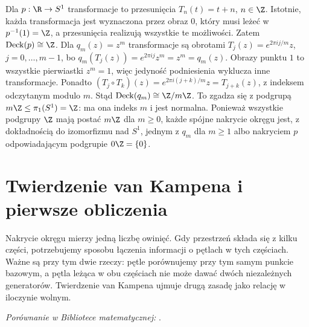 \begin{przyklad}
Dla $p:\R\to S^1$ transformacje to przesunięcia
$T_n(t)=t+n$, $n\in\Z$. Istotnie, każda transformacja
jest wyznaczona przez obraz $0$, który musi leżeć
w $p^{-1}(1)=\Z$, a przesunięcia realizują wszystkie
te możliwości. Zatem $\operatorname{Deck}(p)\cong\Z$.
Dla $q_m(z)=z^m$ transformacje są obrotami
$T_j(z)=e^{2\pi i j/m}z$, $j=0,\ldots,m-1$,
bo $q_m(T_j(z))=e^{2\pi ij}z^m=z^m=q_m(z)$.
Obrazy punktu $1$ to wszystkie pierwiastki $z^m=1$,
więc jedyność podniesienia wyklucza inne transformacje.
Ponadto $(T_j\circ T_k)(z)=e^{2\pi i(j+k)/m}z=T_{j+k}(z)$,
z indeksem odczytanym modulo $m$.
Stąd $\operatorname{Deck}(q_m)\cong\Z/m\Z$.
To zgadza się z podgrupą $m\Z\leq\pi_1(S^1)=\Z$:
ma ona indeks $m$ i jest normalna. Ponieważ wszystkie
podgrupy $\Z$ mają postać $m\Z$ dla $m\geq0$,
każde spójne nakrycie okręgu jest, z dokładnością
do izomorfizmu nad $S^1$, jednym z $q_m$ dla $m\geq1$
albo nakryciem $p$ odpowiadającym podgrupie $0\Z=\{0\}$.
\end{przyklad}

\section{Twierdzenie van Kampena i pierwsze obliczenia}
\label{sec:van-kampen}

Nakrycie okręgu mierzy jedną liczbę owinięć.
Gdy przestrzeń składa się z kilku części,
potrzebujemy sposobu łączenia informacji
o pętlach w tych częściach.
Ważne są przy tym dwie rzeczy: pętle porównujemy
przy tym samym punkcie bazowym, a pętla leżąca
w obu częściach nie może dawać dwóch niezależnych
generatorów. Twierdzenie van Kampena ujmuje
drugą zasadę jako relację w iloczynie wolnym.

\noindent\emph{Porównanie w Bibliotece matematycznej:} .

